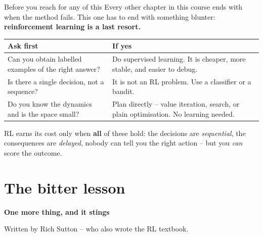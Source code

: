 \documentclass[aspectratio=169]{beamer}
\begin{document}
\begin{frame}{Before you reach for any of this}
  Every other chapter in this course ends with when the method fails. This one has to end with
  something blunter: \textbf{reinforcement learning is a last resort.}

  \vskip 8pt
  \begin{center}
  \small
  \begin{tabular}{p{5.6cm} p{6.4cm}}
    \toprule
    \textbf{Ask first} & \textbf{If yes} \\
    \midrule
    Can you obtain labelled examples of the right answer? & Do supervised learning. It is
      cheaper, more stable, and easier to debug. \\[4pt]
    Is there a single decision, not a sequence? & It is not an RL problem. Use a classifier
      or a bandit. \\[4pt]
    Do you know the dynamics and is the space small? & Plan directly -- value iteration,
      search, or plain optimisation. No learning needed. \\
    \bottomrule
  \end{tabular}
  \end{center}

  \vskip 8pt
  \begin{tcolorbox}[colback=paramgreen!8, colframe=paramgreen, boxrule=0.6pt, arc=2pt]
    \small
    RL earns its cost only when \textbf{all} of these hold: the decisions are
    \emph{sequential}, the consequences are \emph{delayed}, nobody can tell you the right
    action -- but you \emph{can} score the outcome.
  \end{tcolorbox}
\end{frame}

\section{The bitter lesson}
\begin{frame}[plain]
  \begin{center}
    \vskip 1.6cm
    {\Huge\bfseries\color{popblue}One more thing, and it stings}

    \vskip 0.6cm
    {\large Written by Rich Sutton -- who also wrote the RL textbook.}
  \end{center}
\end{frame}
\end{document}
